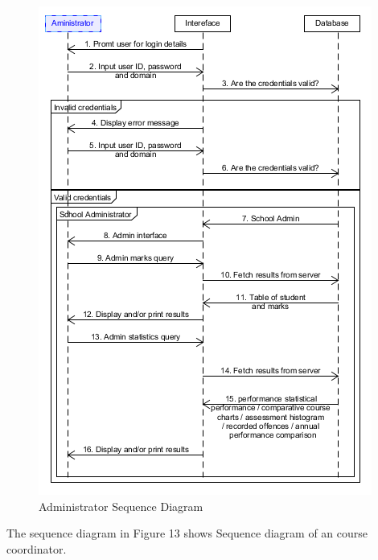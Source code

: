 \documentclass[10pt,onecolumn]{RequimentsGathering}
\begin{document}
	
	\begin{center}
		\begin{figure}[h]
			\centering
			\includegraphics[trim={0cm 0cm 0cm 0cm },clip,scale = 1.1]{AdministratorSequence}
			\caption{ Administrator Sequence Diagram}
		\end{figure}
	\end{center}
	\newpage
	
		The sequence diagram in Figure 13 shows Sequence diagram of an course coordinator.  
	
\end{document}
